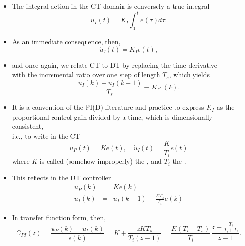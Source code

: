 \begin{frame}
\framesubtitleTC{}
\myPause
 \begin{itemize}[<+-| alert@+>]
 \item The integral action in the CT domain is conversely a true integral:
       \begin{displaymath}
        u_I(t) = K_I \int_0^t e(\tau)d\tau.
       \end{displaymath}
 \item As an immediate consequence, then,
       \begin{displaymath}
        \dot{u}_I(t) = K_I e(t),
       \end{displaymath}
 \item and once again, we relate CT to DT by replacing the time derivative\\
       with the incremental ratio over one step of length $T_s$, which yields
       \begin{displaymath}
        \frac{u_I(k)-u_I(k-1)}{T_s}= K_I e(k).
       \end{displaymath}
 \end{itemize}
\end{frame}

\begin{frame}
\framesubtitleTC{}
\myPause
 \begin{itemize}[<+-| alert@+>]
 \item It is a convention of the PI(D) literature and practice to express $K_I$ as the\\
       proportional control gain divided by a time, which is dimensionally consistent,\\
       i.e., to write in the CT
       \begin{displaymath}
        u_P(t)       = K e(t), \quad
        \dot{u}_I(t) = \frac{K}{T_i} e(t)
       \end{displaymath}
       where $K$ is called (somehow improperly) the , and $T_i$ the .
 \item This reflects in the DT controller
       \begin{displaymath}
        \begin{array}{rcl}
         u_P(k) &=& K e(k) \\
         u_I(k) &=& u_I(k-1) + \frac{KT_s}{T_i} e(k)
        \end{array}
       \end{displaymath}
 \item In transfer function form, then,
       {\small
       \begin{displaymath}
        C_{PI}(z) = \frac{u_P(k)+u_I(k)}{e(k)}
                  = K + \frac{zKT_s}{T_i(z-1)}
                  = \frac{K(T_i+T_s)}{T_i} \, \frac{z-\frac{T_i}{T_i+T_s}}{z-1}.
       \end{displaymath}
       }
 \end{itemize}
\end{frame}

